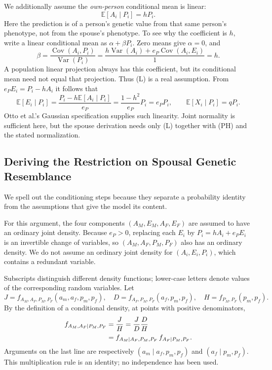 We additionally assume the \emph{own-person} conditional mean is linear:
\begin{equation}
 \mathbb E[A_i\mid P_i]=hP_i.
 \tag{L}\label{eq:model-linearity}
\end{equation}
Here the prediction is of a person's genetic value from that same person's
phenotype, not from the spouse's phenotype. To see why the coefficient is
$h$, write a linear conditional mean as $\alpha+\beta P_i$. Zero means give
$\alpha=0$, and
\[
 \beta=\frac{\operatorname{Cov}(A_i,P_i)}{\operatorname{Var}(P_i)}
 =\frac{h\operatorname{Var}(A_i)+e_P\operatorname{Cov}(A_i,E_i)}{1}=h.
\]
A population linear projection always has this coefficient, but its
conditional mean need not equal that projection. Thus (L) is a real
assumption. From $e_P E_i=P_i-hA_i$ it follows that
\[
 \mathbb E[E_i\mid P_i]
 =\frac{P_i-h\mathbb E[A_i\mid P_i]}{e_P}
 =\frac{1-h^2}{e_P}P_i=e_P P_i,\qquad
 \mathbb E[X_i\mid P_i]=qP_i.
\]
Otto et al.'s Gaussian specification supplies such linearity. Joint
normality is sufficient here, but the spouse derivation needs only (L)
together with (PH) and the stated normalization.

\subsection{Deriving the Restriction on Spousal Genetic Resemblance}
\label{sec:model-spouses}

We spell out the conditioning steps because they separate a probability
identity from the assumptions that give the model its content.

For this argument, the four components $(A_M,E_M,A_F,E_F)$ are assumed
to have an ordinary joint density.
Because $e_P>0$, replacing each $E_i$ by $P_i=hA_i+e_P E_i$ is an invertible
change of variables, so $(A_M,A_F,P_M,P_F)$ also has an ordinary density.
We do not assume an ordinary joint density for $(A_i,E_i,P_i)$, which
contains a redundant variable.

Subscripts distinguish different density functions; lower-case letters
denote values of the corresponding random variables. Let
\[
 J=f_{A_M,A_F,P_M,P_F}(a_m,a_f,p_m,p_f),\quad
 D=f_{A_F,P_M,P_F}(a_f,p_m,p_f),\quad
 H=f_{P_M,P_F}(p_m,p_f).
\]
By the definition of a conditional density, at points with positive
denominators,
\begin{align}
 f_{A_M,A_F\mid P_M,P_F}
 &=\frac{J}{H}
   =\frac{J}{D}\frac{D}{H}\notag\\
 &=f_{A_M\mid A_F,P_M,P_F}\,
   f_{A_F\mid P_M,P_F}.
 \label{eq:model-multiplication}
\end{align}
Arguments on the last line are respectively
$(a_m\mid a_f,p_m,p_f)$ and $(a_f\mid p_m,p_f)$.
This multiplication rule is an identity; no independence has been used.

